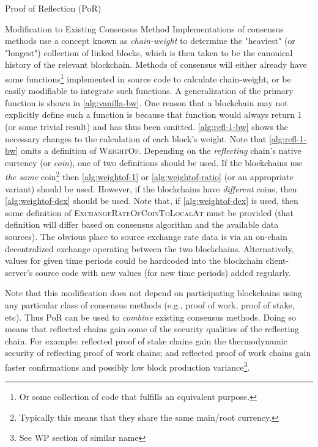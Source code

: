 \begin{section}{Proof of Reflection (PoR)}
\begin{subsection}{Modification to Existing Consensus Method}
     Implementations of consensus methods use a concept known as \emph{chain-weight} to determine the "heaviest" (or "longest") collection of linked blocks, which is then taken to be the canonical history of the relevant blockchain.
     Methods of consensus will either already have some functions\footnote{Or some collection of code that fulfills an equivalent purpose.} implemented in source code to calculate chain-weight, or be easily modifiable to integrate such functions.
     A generalization of the primary function is shown in \autoref{alg:vanilla-bw}.
     One reason that a blockchain may not explicitly define such a function is because that function would always return 1 (or some trivial result) and has thus been omitted.
     \autoref{alg:refl-1-bw} shows the necessary changes to the calculation of each block's weight.
     Note that \autoref{alg:refl-1-bw} omits a definition of \textsc{WeightOf}.
     Depending on the \emph{reflecting} chain's native currency (or \emph{coin}), one of two definitions should be used. If the blockchains use \emph{the same} coin\footnote{Typically this means that they share the same main/root currency.} then \autoref{alg:weightof-1} or \autoref{alg:weightof-ratio} (or an appropriate variant) should be used.
     However, if the blockchains have \emph{different} coins, then \autoref{alg:weightof-dex} should be used.
     Note that, if \autoref{alg:weightof-dex} is used, then some definition of \textsc{ExchangeRateOfCoinToLocalAt} must be provided (that definition will differ based on consensus algorithm and the available data sources).
     The obvious place to source exchange rate data is via an on-chain decentralized exchange operating between the two blockchains.
     Alternatively, values for given time periods could be hardcoded into the blockchain client-server's source code with new values (for new time periods) added regularly.

     Note that this modification does not depend on participating blockchains using any particular class of consensus methods (e.g., proof of work, proof of stake, etc). Thus PoR can be used to \emph{combine} existing consensus methods. Doing so means that reflected chains gain some of the security qualities of the reflecting chain. For example: reflected proof of stake chains gain the thermodynamic security of reflecting proof of work chains; and reflected proof of work chains gain faster confirmations and possibly low block production variance\footnote{See WP section of similar name}.


\end{subsection}
\end{section}
